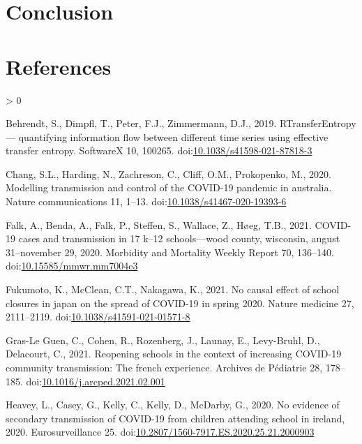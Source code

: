 \documentclass[]{elsarticle} %
\newlength{\cslhangindent}
\newenvironment{CSLReferences}[2] %
 {%
  \setlength{\parindent}{0pt}
  \ifodd #1 \everypar{\setlength{\hangindent}{\cslhangindent}}\ignorespaces\fi
  \ifnum #2 > 0
  \setlength{\parskip}{#2\baselineskip}
  \fi
 }%
 {}
\begin{document}
\hypertarget{conclusion}{%
\section{Conclusion}\label{conclusion}}

\hypertarget{references}{%
\section*{References}\label{references}}

\hypertarget{refs}{}
\begin{CSLReferences}{1}{0}
\leavevmode\hypertarget{ref-behrendt2019rtransferentropy}{}%
Behrendt, S., Dimpfl, T., Peter, F.J., Zimmermann, D.J., 2019.
RTransferEntropy --- quantifying information flow between different time
series using effective transfer entropy. SoftwareX 10, 100265.
doi:\href{https://doi.org/10.1038/s41598-021-87818-3}{10.1038/s41598-021-87818-3}

\leavevmode\hypertarget{ref-chang2020modelling}{}%
Chang, S.L., Harding, N., Zachreson, C., Cliff, O.M., Prokopenko, M.,
2020. Modelling transmission and control of the COVID-19 pandemic in
australia. Nature communications 11, 1--13.
doi:\href{https://doi.org/10.1038/s41467-020-19393-6}{10.1038/s41467-020-19393-6}

\leavevmode\hypertarget{ref-falk2021covid}{}%
Falk, A., Benda, A., Falk, P., Steffen, S., Wallace, Z., Høeg, T.B.,
2021. COVID-19 cases and transmission in 17 k--12 schools---wood county,
wisconsin, august 31--november 29, 2020. Morbidity and Mortality Weekly
Report 70, 136--140.
doi:\href{https://doi.org/10.15585/mmwr.mm7004e3}{10.15585/mmwr.mm7004e3}

\leavevmode\hypertarget{ref-fukumoto2021no}{}%
Fukumoto, K., McClean, C.T., Nakagawa, K., 2021. No causal effect of
school closures in japan on the spread of COVID-19 in spring 2020.
Nature medicine 27, 2111--2119.
doi:\href{https://doi.org/10.1038/s41591-021-01571-8}{10.1038/s41591-021-01571-8}

\leavevmode\hypertarget{ref-grasleguen2021reopening}{}%
Gras-Le Guen, C., Cohen, R., Rozenberg, J., Launay, E., Levy-Bruhl, D.,
Delacourt, C., 2021. Reopening schools in the context of increasing
COVID-19 community transmission: The french experience. Archives de
Pédiatrie 28, 178--185.
doi:\href{https://doi.org/10.1016/j.arcped.2021.02.001}{10.1016/j.arcped.2021.02.001}

\leavevmode\hypertarget{ref-heavey2020evidence}{}%
Heavey, L., Casey, G., Kelly, C., Kelly, D., McDarby, G., 2020. No
evidence of secondary transmission of COVID-19 from children attending
school in ireland, 2020. Eurosurveillance 25.
doi:\href{https://doi.org/10.2807/1560-7917.ES.2020.25.21.2000903}{10.2807/1560-7917.ES.2020.25.21.2000903}


\end{CSLReferences}
\end{document}
